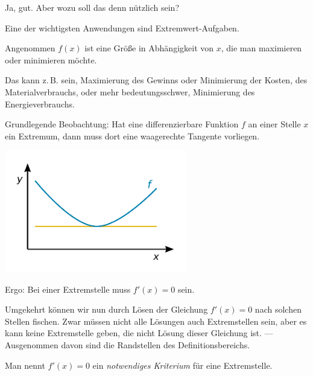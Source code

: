 \documentclass{beamer}
\begin{document}
\begin{frame}
Ja, gut. Aber wozu soll das denn nützlich sein?
\end{frame}

\begin{frame}
Eine der wichtigsten Anwendungen sind Extremwert-Aufgaben.
\end{frame}

\begin{frame}
Angenommen $f(x)$ ist eine Größe in Abhängigkeit von $x$, die
man maximieren oder minimieren möchte.\pause

\vspace{0.8em}
Das kann z.\,B. sein, Maximierung des Gewinns oder Minimierung der Kosten,
des Materialverbrauchs,
oder mehr bedeutungsschwer, Minimierung des Energieverbrauchs.
\end{frame}

\begin{frame}[t]
\vspace{1em}
Grundlegende Beobachtung: Hat eine differenzierbare Funktion $f$ an
einer Stelle $x$ ein Extremum, dann muss dort eine waagerechte
Tangente vorliegen.
\pause

\vspace{-1em}
\begin{center}
\includegraphics[width=80mm]{img/Minimum.pdf}
\end{center}
\end{frame}

\begin{frame}
Ergo: Bei einer Extremstelle muss $f'(x)=0$ sein.
\pause

\vspace{0.8em}
Umgekehrt können wir nun durch Lösen der Gleichung $f'(x)=0$ nach
solchen Stellen fischen. Zwar müssen nicht alle Lösungen auch
Extremstellen sein, aber es kann keine Extremstelle geben, die nicht
Lösung dieser Gleichung ist. {\footnotesize
--- Ausgenommen davon sind die Randstellen des Definitionsbereichs.}
\pause

\vspace{0.8em}
Man nennt $f'(x)=0$ ein \emph{notwendiges Kriterium} für eine
Extremstelle.
\end{frame}
\end{document}
